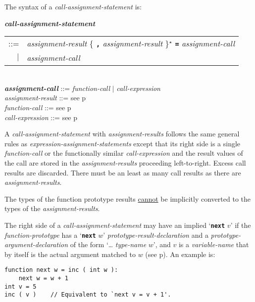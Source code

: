 \documentclass[12pt]{article}
\newcommand{\TT}[1]{{\tt \bfseries #1}}
\newcommand{\STAR}{{\Large $^\star$}}
\newcommand{\emkey}[1]{{\em \bfseries #1}}
\newcommand{\pagref}[1]{p\pageref{#1}}
\newenvironment{indpar}[1][0.3in]%
	{\begin{list}{}%
		     {\setlength{\itemsep}{0in}%
		      \setlength{\topsep}{0in}%
		      \setlength{\parsep}{1ex}%
		      \setlength{\labelwidth}{#1}%
		      \setlength{\leftmargin}{#1}%
		      \addtolength{\leftmargin}{\labelsep}}%
	 \item}%
	{\end{list}}
\begin{document}
The syntax of a {\em call-assignment-statement} is:
\begin{indpar}
\emkey{call-assignment-statement} \\
\hspace*{0.5in} \begin{tabular}{rl}
                ::= & {\em assignment-result}
                      \{ \TT{,} {\em assignment-result} \}\STAR{}
		      \TT{=} {\em assignment-call} \\
		$|$ & {\em assignment-call}
		\end{tabular}
\\[0.5ex]
\emkey{assignment-call} ::= {\em function-call} $|$
                            {\em call-expression}
\\[0.5ex]
{\em assignment-result} ::= see \pagref{ASSIGNMENT-RESULT}
\\[0.5ex]
{\em function-call} ::= see \pagref{FUNCTION-CALL}
\\[0.5ex]
{\em call-expression} ::= see \pagref{CALL-EXPRESSION}
\end{indpar}

A {\em call-assignment-statement} with {\em assignment-results}
follows the same general rules
as {\em expres\-sion-assignment-state\-ments} except that its right
side is a single {\em function-call} or the functionally similar
{\em call-expression} and the result values of the call are stored
in the {\em assignment-results} proceeding left-to-right.
Excess call results are discarded.  There must be an least as many
call results as there are {\em assignment-results}.

The types of the function prototype results \underline{cannot}
be implicitly converted to the types of the {\em assignment-results}.

\label{CALL-NEXT-PROMOTION}
The right side of a {\em call-assignment-statement} may have
an implied `\TT{next} $v$' if the {\em function-prototype} has 
a `\TT{next} $w$' {\em prototype-result-declaration}
and a {\em prototype-argument-declaration} of the
form `\dots{} {\em type-name} $w$', and $v$ is a {\em variable-name}
that by itself is the actual argument matched to $w$
(see \pagref{PROTOTYPE-NEXT-RESULT}).  An example is:
\begin{indpar}\begin{verbatim}
function next w = inc ( int w ):
    next w = w + 1
int v = 5
inc ( v )    // Equivalent to `next v = v + 1'.
\end{verbatim}\end{indpar}
\end{document}
